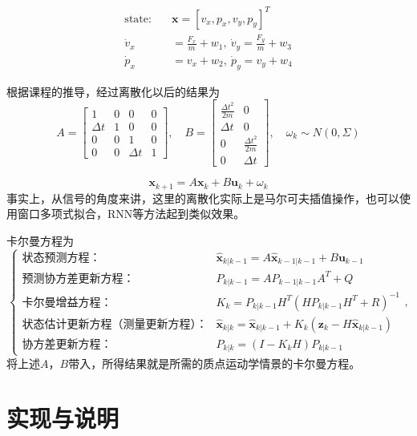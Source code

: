 \documentclass{article}
\begin{document}
			\[
			\begin{aligned}
				\text{state} : \quad & \mathbf{x} = [v_x, p_x, v_y, p_y]^T \\
				\dot{v}_x &= \frac{F_x}{m} + w_1,~
				\dot{v}_y = \frac{F_y}{m} + w_3\\
				\dot{p}_x &= v_x + w_2,~
				\dot{p}_y = v_y + w_4
			\end{aligned}
			\]
			
			根据课程的推导，经过离散化以后的结果为
			\[
			A = 
			\begin{bmatrix}
				1 & 0 & 0 & 0 \\
				\Delta t & 1 & 0 & 0 \\
				0 & 0 & 1 & 0 \\
				0 & 0 & \Delta t & 1 
			\end{bmatrix},
			\quad
			B = 
			\begin{bmatrix}
				\frac{\Delta t^2}{2m} & 0 \\
				\Delta t & 0 \\
				0 & \frac{\Delta t^2}{2m} \\
				0 & \Delta t
			\end{bmatrix},
			\quad
			\omega_k \sim N(0, \Sigma)
			\]
			
			\[
			\mathbf{x}_{k+1} = A \mathbf{x}_k + B \mathbf{u}_k + \omega_k
			\]
			事实上，从信号的角度来讲，这里的离散化实际上是马尔可夫插值操作，也可以使用窗口多项式拟合，RNN等方法起到类似效果。
			
			卡尔曼方程为
			\[
			\begin{cases}
				\text{状态预测方程：} & \hat{\mathbf{x}}_{k|k-1} = A \hat{\mathbf{x}}_{k-1|k-1} + B \mathbf{u}_{k-1} \\
				\text{预测协方差更新方程：} & P_{k|k-1} = A P_{k-1|k-1} A^T + Q \\
				\text{卡尔曼增益方程：} & K_k = P_{k|k-1} H^T (H P_{k|k-1} H^T + R)^{-1} \\
				\text{状态估计更新方程（测量更新方程）：} & \hat{\mathbf{x}}_{k|k} = \hat{\mathbf{x}}_{k|k-1} + K_k (\mathbf{z}_k - H \hat{\mathbf{x}}_{k|k-1}) \\
				\text{协方差更新方程：} & P_{k|k} = (I - K_k H) P_{k|k-1}
			\end{cases},
			\]
			将上述$A$，$B$带入，所得结果就是所需的质点运动学情景的卡尔曼方程。
		
	\section{实现与说明}
\end{document}
